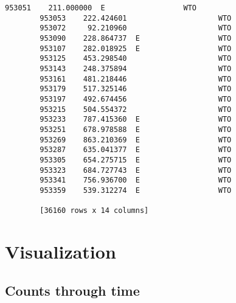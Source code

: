 \documentclass[11pt]{article}
\begin{document}
\begin{Verbatim}[commandchars=\\\{\}]
        953051    211.000000  E                  WTO       
        953053    222.424601                     WTO       
        953072     92.210960                     WTO       
        953090    228.864737  E                  WTO       
        953107    282.018925  E                  WTO       
        953125    453.298540                     WTO       
        953143    248.375894                     WTO       
        953161    481.218446                     WTO       
        953179    517.325146                     WTO       
        953197    492.674456                     WTO       
        953215    504.554372                     WTO       
        953233    787.415360  E                  WTO       
        953251    678.978588  E                  WTO       
        953269    863.210369  E                  WTO       
        953287    635.041377  E                  WTO       
        953305    654.275715  E                  WTO       
        953323    684.727743  E                  WTO       
        953341    756.936700  E                  WTO       
        953359    539.312274  E                  WTO       
        
        [36160 rows x 14 columns]
\end{Verbatim}
            
    \section{Visualization}\label{visualization}

    \subsection{Counts through time}\label{counts-through-time}
\end{document}
